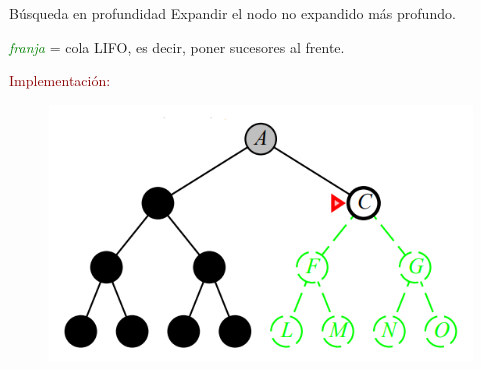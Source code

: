
\begin{frame}{Búsqueda en profundidad}
Expandir el nodo no expandido más profundo.\\
\begin{center}
    \textit{\textcolor{Green}{franja}} = cola LIFO, es decir, poner sucesores al
    frente.\\
\end{center}{}

\textcolor{DarkRed}{Implementación:}
    \begin{figure}
        \includegraphics[scale=0.2]{51_chap3_pag51.png}
    \end{figure}
\end{frame}{}
